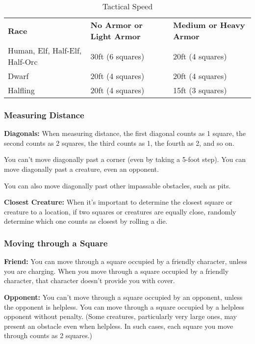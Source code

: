 \begin{table}[htb]
\caption{Tactical Speed}
\centering
\begin{tabular}{l l l}
\textbf{Race} & \textbf{No Armor or Light Armor} & \textbf{Medium or Heavy Armor}\\
Human, Elf, Half-Elf, Half-Orc & 30ft (6 squares) & 20ft (4 squares)\\
Dwarf & 20ft (4 squares) & 20ft (4 squares)\\
Halfling & 20ft (4 squares) & 15ft (3 squares)\\
\end{tabular}
\end{table}

\subsubsection{Measuring Distance}

\textbf{Diagonals:} When measuring distance, the first diagonal counts as 1 square, 
the second counts as 2 squares, the third counts as 1, the fourth as 2, and so 
on.

You can't move diagonally past a corner (even by taking a 5-foot step). You can 
move diagonally past a creature, even an opponent.

You can also move diagonally past other impassable obstacles, such as pits.

\textbf{Closest Creature:} When it's important to determine the closest square 
or creature to a location, if two squares or creatures are equally close, randomly 
determine which one counts as closest by rolling a die.

\subsubsection{Moving through a Square}

\textbf{Friend:} You can move through a square occupied by a friendly character, 
unless you are charging. When you move through a square occupied by a friendly 
character, that character doesn't provide you with cover.

\textbf{Opponent:} You can't move through a square occupied by an opponent, unless 
the opponent is helpless. You can move through a square occupied by a helpless 
opponent without penalty. (Some creatures, particularly very large ones, may present 
an obstacle even when helpless. In such cases, each square you move through counts 
as 2 squares.)

